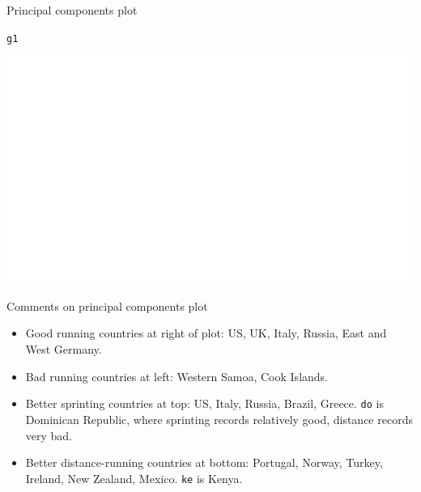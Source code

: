 \documentclass[unknownkeysallowed]{beamer}\usepackage[]{graphicx}\usepackage[]{color}
\makeatletter
\def\maxwidth{ %
  \ifdim\Gin@nat@width>\linewidth
    \linewidth
  \else
    \Gin@nat@width
  \fi
}
\newcommand{\hlstd}[1]{\textcolor[rgb]{0.345,0.345,0.345}{#1}}%
\newenvironment{kframe}{%
 \def\at@end@of@kframe{}%
 \ifinner\ifhmode%
  \def\at@end@of@kframe{\end{minipage}}%
  \begin{minipage}{\columnwidth}%
 \fi\fi%
 \def\FrameCommand##1{\hskip\@totalleftmargin \hskip-\fboxsep
 \colorbox{shadecolor}{##1}\hskip-\fboxsep
     \hskip-\linewidth \hskip-\@totalleftmargin \hskip\columnwidth}%
 \MakeFramed {\advance\hsize-\width
   \@totalleftmargin\z@ \linewidth\hsize
   \@setminipage}}%
 {\par\unskip\endMakeFramed%
 \at@end@of@kframe}
\newenvironment{knitrout}{}{} %
\makeatother
\begin{document}
\begin{frame}{Principal components plot}

\begin{knitrout}
\color{fgcolor}\begin{kframe}
\begin{alltt}
\hlstd{g1}
\end{alltt}


{\ttfamily\noindent\bfseries\color{errorcolor}{\#\# Error in FUN(X[[i]], ...): object 'country' not found}}\end{kframe}
\includegraphics[width=\maxwidth]{figure/lecce-1} 

\end{knitrout}

  
\end{frame}

\begin{frame}[fragile]{Comments on principal components plot}
  
  \begin{itemize}
  \item Good running countries at right of plot: US, UK, Italy,
    Russia, East and West Germany.
  \item Bad running countries at left: Western Samoa, Cook Islands.
  \item Better sprinting countries at top: US, Italy, Russia,
    Brazil, Greece. \texttt{do} is Dominican Republic, where sprinting
    records relatively good, distance records very bad.
  \item Better distance-running countries at bottom: Portugal, Norway,
    Turkey, Ireland, New Zealand, Mexico. \texttt{ke} is Kenya.
  \end{itemize}
  
\end{frame}
\end{document}
